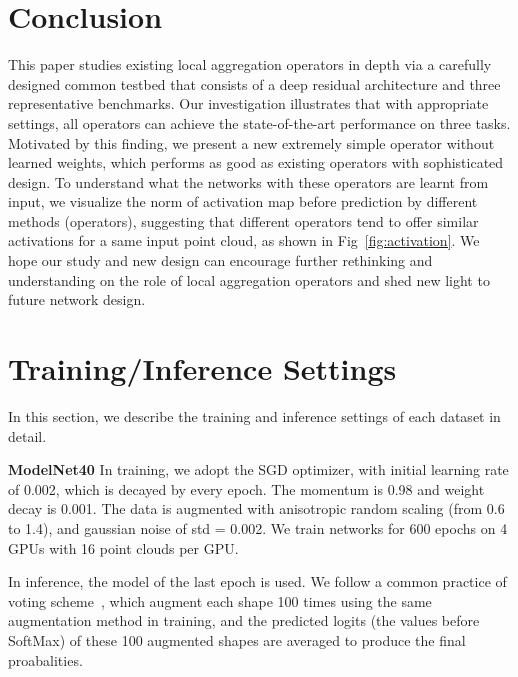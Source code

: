 \documentclass[runningheads]{llncs}
\begin{document}
\section{Conclusion}
\vspace{-.5em}

This paper studies existing local aggregation operators in depth via a carefully designed common testbed that consists of a deep residual architecture and three representative benchmarks. Our investigation illustrates that with appropriate settings, all operators can achieve the state-of-the-art performance on three tasks. Motivated by this finding, we present a new extremely simple operator without learned weights, which performs as good as existing operators with sophisticated design. To understand what the networks with these operators are learnt from input, we visualize the norm of activation map before prediction by different methods (operators), suggesting that different operators tend to offer similar activations for a same input point cloud, as shown in Fig~\ref{fig:activation}. We hope our study and new design can encourage further rethinking and understanding on the role of local aggregation operators and shed new light to future network design.






\clearpage{}\appendix

\renewcommand{\thesection}{A\arabic{section}}

\section{Training/Inference Settings}
In this section, we describe the training and inference settings of each dataset in detail.

\vspace{0.3em} \noindent \textbf{ModelNet40}
In training, we adopt the SGD optimizer, with initial learning rate of 0.002, which is decayed by  every epoch. The momentum is 0.98 and weight decay is 0.001. The data is augmented with anisotropic random scaling (from 0.6 to 1.4), and gaussian noise of std = 0.002. We train networks for 600 epochs on 4 GPUs with 16 point clouds per GPU.

In inference, the model of the last epoch is used. We follow a common practice of voting scheme~\cite{qi2017pointnet++,wang2019dgcnn,liu2019rscnn,thomas2019kpconv}, which augment each shape 100 times using the same augmentation method in training, and the predicted logits (the values before SoftMax) of these 100 augmented shapes are averaged to produce the final proabalities.
\end{document}
